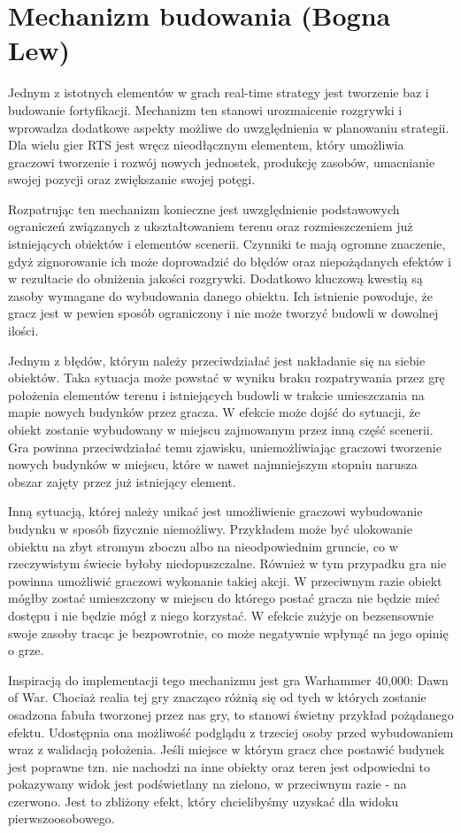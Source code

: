 \section{Mechanizm budowania (Bogna Lew)}\label{chap:build}
Jednym z istotnych elementów w grach real-time strategy jest tworzenie baz i budowanie fortyfikacji. Mechanizm ten
stanowi urozmaicenie rozgrywki i wprowadza dodatkowe aspekty możliwe do uwzględnienia w planowaniu strategii. Dla wielu
gier RTS jest wręcz nieodłącznym elementem, który umożliwia graczowi tworzenie i rozwój nowych jednostek, produkcję
zasobów, umacnianie swojej pozycji oraz zwiększanie swojej potęgi.

Rozpatrując ten mechanizm konieczne jest uwzględnienie podstawowych ograniczeń związanych z ukształtowaniem terenu oraz
rozmieszczeniem już istniejących obiektów i elementów scenerii. Czynniki te mają ogromne znaczenie, gdyż zignorowanie
ich może doprowadzić do błędów oraz niepożądanych efektów i w rezultacie do obniżenia jakości rozgrywki. Dodatkowo
kluczową kwestią są zasoby wymagane do wybudowania danego obiektu. Ich istnienie powoduje, że gracz jest w pewien sposób
ograniczony i nie może tworzyć budowli w dowolnej ilości.

Jednym z błędów, którym należy przeciwdziałać jest nakładanie się na siebie obiektów. Taka sytuacja może powstać w
wyniku braku rozpatrywania przez grę położenia elementów terenu i istniejących budowli w trakcie umieszczania na mapie
nowych budynków przez gracza. W efekcie może dojść do sytuacji, że obiekt zostanie wybudowany w miejscu zajmowanym przez
inną część scenerii. Gra powinna przeciwdziałać temu zjawisku, uniemożliwiając graczowi tworzenie nowych budynków w
miejscu, które w nawet najmniejszym stopniu narusza obszar zajęty przez już istniejący element.

Inną sytuacją, której należy unikać jest umożliwienie graczowi wybudowanie budynku w sposób fizycznie niemożliwy.
Przykładem może być ulokowanie obiektu na zbyt stromym zboczu albo na nieodpowiednim gruncie, co w rzeczywistym świecie
byłoby niedopuszczalne. Również w tym przypadku gra nie powinna umożliwić graczowi wykonanie takiej akcji. W przeciwnym
razie obiekt mógłby zostać umieszczony w miejscu do którego postać gracza nie będzie mieć dostępu i nie będzie mógł z
niego korzystać. W efekcie zużyje on bezsensownie swoje zasoby tracąc je bezpowrotnie, co może negatywnie wpłynąć na
jego opinię o grze.

Inspiracją do implementacji tego mechanizmu jest gra Warhammer 40,000: Dawn of War. Chociaż realia tej gry znacząco
różnią się od tych w których zostanie osadzona fabuła tworzonej przez nas gry, to stanowi świetny przykład pożądanego
efektu. Udostępnia ona możliwość podglądu z trzeciej osoby przed wybudowaniem wraz z walidacją położenia. Jeśli miejsce
w którym gracz chce postawić budynek jest poprawne tzn. nie nachodzi na inne obiekty oraz teren jest odpowiedni to
pokazywany widok jest podświetlany na zielono, w przeciwnym razie - na czerwono. Jest to zbliżony efekt, który
chcielibyśmy uzyskać dla widoku pierwszoosobowego.

